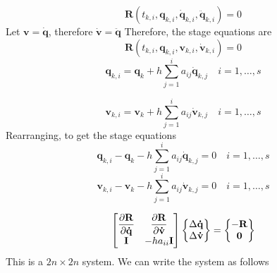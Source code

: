 \documentclass[pdftex,11pt,letter]{article}
\begin{document}
\begin{multicols}{2}
\begin{equation}
  \mathbf{R}\left(t_{k,i}, \mathbf{q}_{k,i}, \mathbf{\dot{q}}_{k,i},
  \mathbf{\ddot{q}}_{k,i}\right) = 0
\end{equation}
Let $\mathbf{v}=\mathbf{\dot{q}}$, therefore $\mathbf{\dot{v}}=\mathbf{\ddot{q}}$
Therefore, the stage equations are
\begin{equation}
  \mathbf{R}\left(t_{k,i}, \mathbf{q}_{k,i}, \mathbf{v}_{k,i}, \mathbf{\dot{v}}_{k,i}\right) = 0
\end{equation}
\begin{equation}
  \mathbf{q}_{k,i} = \mathbf{q}_{k} + h \sum_{j=1}^i a_{ij} \mathbf{\dot{q}}_{k,j} \quad i = 1,\ldots,s 
\end{equation}

\begin{equation}
  \mathbf{v}_{k,i} = \mathbf{v}_{k} + h \sum_{j=1}^i a_{ij} \mathbf{\dot{v}}_{k,j} \quad i = 1,\ldots,s 
\end{equation}
Rearranging, to get the stage equations
\begin{equation}
  \mathbf{q}_{k,i} - \mathbf{q}_{k} - h \sum_{j=1}^i a_{ij}
  \mathbf{\dot{q}}_{k,j} = 0 \quad i = 1,\ldots,s
\end{equation}
\begin{equation}
  \mathbf{{v}}_{k,i} - \mathbf{v}_{k} - h \sum_{j=1}^i a_{ij}
  \mathbf{\dot{v}}_{k,j} = 0 \quad i = 1,\ldots,s
\end{equation}

\begin{equation}
  \begin{bmatrix}
    \mathbf{\dfrac{\partial R}{\partial \dot{q}}} & \mathbf{\dfrac{\partial R}{\partial \dot{v}}} \\
    \mathbf{I} & -h a_{ii}\mathbf{I}\\
  \end{bmatrix}   \begin{Bmatrix}
    \Delta{\mathbf{\dot{q}}} \\
    \Delta{\mathbf{\dot{v}}} \\
  \end{Bmatrix} =    \begin{Bmatrix}
    -\mathbf{R} \\ \mathbf{0}
  \end{Bmatrix}
\end{equation}
This is a $2n \times 2n$ system. We can write the system as follows


\end{multicols}
\end{document}
